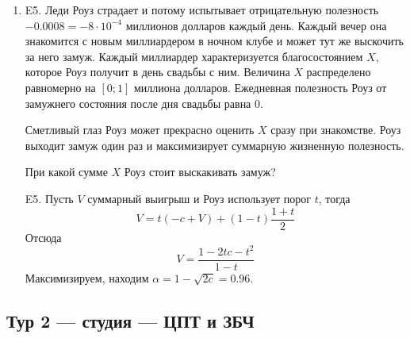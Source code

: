 \documentclass[12pt]{article}
\newenvironment{problem}{}{}
\newenvironment{sol}{}{} %
\begin{document}
\begin{enumerate}
\begin{problem}
\item[E5.] Леди Роуз страдает и потому испытывает отрицательную полезность $-0.0008=-8\cdot 10^{-4}$ миллионов долларов каждый день. Каждый вечер она знакомится с новым миллиардером в ночном клубе и может тут же выскочить за него замуж. Каждый миллиардер характеризуется благосостоянием $X$, которое Роуз получит в день свадьбы с ним. Величина $X$ распределено равномерно на $[0;1]$ миллиона долларов. Ежедневная полезность Роуз от замужнего состояния после дня свадьбы равна 0. 

Сметливый глаз Роуз может прекрасно оценить $X$ сразу при знакомстве. Роуз выходит замуж один раз и максимизирует суммарную жизненную полезность.

При какой сумме $X$ Роуз стоит выскакивать замуж?

\begin{sol}
E5. Пусть $V$ суммарный выигрыш и Роуз использует порог $t$, тогда
\[
V = t (-c +  V) + (1-t) \frac{1+t}{2}
\]
Отсюда 
\[
V=\frac{1-2t c - t^2}{1-t}
\]
Максимизируем, находим $\alpha = 1 - \sqrt{2c}=0.96$.
\end{sol}
\end{problem}
\end{enumerate}



\newpage
\subsection{Тур 2 — студия — ЦПТ и ЗБЧ}
\end{document}
